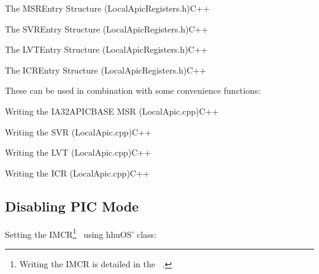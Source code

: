 \begin{codeblock}[label=lst:msrentry]{The MSREntry Structure (LocalApicRegisters.h)}{C++}
\end{codeblock}

\begin{codeblock}[label=lst:svrentry]{The SVREntry Structure (LocalApicRegisters.h)}{C++}
\end{codeblock}

\begin{codeblock}[label=lst:lvtentry]{The LVTEntry Structure (LocalApicRegisters.h)}{C++}
\end{codeblock}

\begin{codeblock}[label=lst:icrentry]{The ICREntry Structure (LocalApicRegisters.h)}{C++}
\end{codeblock}

These can be used in combination with some convenience functions:

\begin{codeblock}{Writing the IA32\textunderscore{}APIC\textunderscore{}BASE MSR (LocalApic.cpp)}{C++}
\end{codeblock}

\begin{codeblock}{Writing the SVR (LocalApic.cpp)}{C++}
\end{codeblock}

\begin{codeblock}{Writing the LVT (LocalApic.cpp)}{C++}
\end{codeblock}

\begin{codeblock}{Writing the ICR (LocalApic.cpp)}{C++}
\end{codeblock}

\subsection{Disabling PIC Mode}
\label{subsec:apxdisablepic}

Setting the IMCR\footnote{
  Writing the IMCR is detailed in the ~\autocite[sec.~3.6.2.1]{mpspec}.}
\ using hhuOS'  class:

